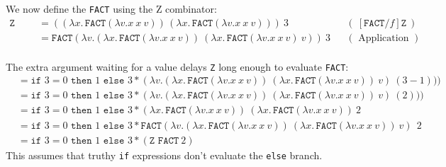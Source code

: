 \begin{Example}
    
    We now define the \texttt{FACT} using the Z combinator:
    \begin{align*}
        \texttt{Z FACT 3} & = ((\lambda x.\, \texttt{FACT} (\lambda v.x\ x\ v))\, (\lambda x.\, \texttt{FACT} (\lambda v.x\ x\ v)))\ 3 && (\ [\texttt{FACT}/f]\texttt{Z}\ )\\
        & = \texttt{FACT} (\lambda v.(\lambda x.\, \texttt{FACT} (\lambda v.x\ x\ v))\ (\lambda x.\, \texttt{FACT} (\lambda v.x\ x\ v)\ v))\ 3 && ( \text{ Application }) \\
    \end{align*}

    \vspace{-1em}
    \noindent
    The extra argument waiting for a value delays \texttt{Z} long enough to evaluate \texttt{FACT}:
    \begin{align*}
        &= \texttt{if } 3 = 0 \texttt{ then } 1 \texttt{ else } 3 * (\lambda v.(\lambda x.\, \texttt{FACT} (\lambda v.x\ x\ v))\ (\lambda x.\, \texttt{FACT} (\lambda v.x\ x\ v))\ v)\ (3 - 1))) \\
        &= \texttt{if } 3 = 0 \texttt{ then } 1 \texttt{ else } 3 * (\lambda v.(\lambda x.\, \texttt{FACT} (\lambda v.x\ x\ v))\ (\lambda x.\, \texttt{FACT} (\lambda v.x\ x\ v))\ v)\ (2))) \\
        &= \texttt{if } 3 = 0 \texttt{ then } 1 \texttt{ else } 3 * (\lambda x.\, \texttt{FACT} (\lambda v.x\ x\ v))\ (\lambda x.\, \texttt{FACT} (\lambda v.x\ x\ v))\ 2 \\
        &= \texttt{if } 3 = 0 \texttt{ then } 1 \texttt{ else } 3 * \texttt{FACT} (\lambda v.(\lambda x.\, \texttt{FACT} (\lambda v.x\ x\ v))\ (\lambda x.\, \texttt{FACT} (\lambda v.x\ x\ v))\ v)\ \ 2 \\
        &= \texttt{if } 3 = 0 \texttt{ then } 1 \texttt{ else } 3 * (\texttt{Z FACT} \ 2)
    \end{align*}
    \noindent
    This assumes that truthy \texttt{if} expressions don't evaluate the \texttt{else} branch.
\end{Example}
\noindent

\newpage 

